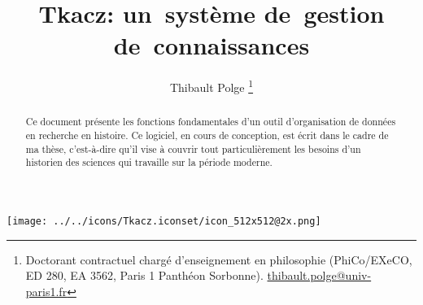 \documentclass[11pt]{article}
\begin{document}
\title{Tkacz: un~système de~gestion de~connaissances}

\author{Thibault Polge%
\thanks{Doctorant contractuel chargé d'enseignement en philosophie (PhiCo/EXeCO, ED
280, EA 3562, Paris 1 Panthéon Sorbonne). \protect\href{http://mailto:thibault.polge@univ-paris1.fr}{thibault.polge@univ-paris1.fr}%
}}

\date{}

\maketitle

\begin{abstract}
Ce document présente les fonctions fondamentales d'un outil d'organisation
de données en recherche en histoire. Ce logiciel, en cours de conception,
est écrit dans le cadre de ma thèse, c'est-à-dire qu'il vise à couvrir
tout particulièrement les besoins d'un historien des sciences qui
travaille sur la période moderne.
\end{abstract}
\begin{center}\texttt{[image: ../../icons/Tkacz.iconset/icon\_512x512@2x.png]}\end{center}

\bigskip\begin{spacing}{.7}
\makeatletter
    \setcounter{tocdepth}{2}
\makeatother
\end{spacing}

\clearpage
\end{document}
